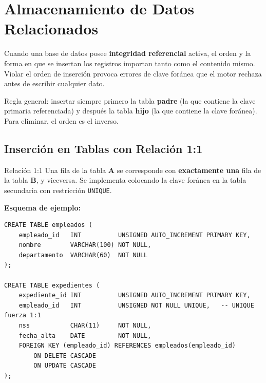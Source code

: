 \newpage
\section{Almacenamiento de Datos Relacionados}

Cuando una base de datos posee \textbf{integridad referencial} activa, el orden
y la forma en que se insertan los registros importan tanto como el contenido
mismo. Violar el orden de inserción provoca errores de clave foránea que el
motor rechaza antes de escribir cualquier dato.

\begin{nota}
  Regla general: insertar siempre primero la tabla \textbf{padre} (la que
  contiene la clave primaria referenciada) y después la tabla \textbf{hijo}
  (la que contiene la clave foránea). Para eliminar, el orden es el inverso.
\end{nota}

\subsection{Inserción en Tablas con Relación 1:1}

\begin{definicion}{Relación 1:1}
  Una fila de la tabla \textbf{A} se corresponde con \textbf{exactamente una}
  fila de la tabla \textbf{B}, y viceversa. Se implementa colocando la clave
  foránea en la tabla secundaria con restricción \texttt{UNIQUE}.
\end{definicion}

\textbf{Esquema de ejemplo:}

\begin{lstlisting}[style=sql, caption={Tablas con relación 1:1 — empleado y expediente}]
CREATE TABLE empleados (
    empleado_id   INT          UNSIGNED AUTO_INCREMENT PRIMARY KEY,
    nombre        VARCHAR(100) NOT NULL,
    departamento  VARCHAR(60)  NOT NULL
);

CREATE TABLE expedientes (
    expediente_id INT          UNSIGNED AUTO_INCREMENT PRIMARY KEY,
    empleado_id   INT          UNSIGNED NOT NULL UNIQUE,   -- UNIQUE fuerza 1:1
    nss           CHAR(11)     NOT NULL,
    fecha_alta    DATE         NOT NULL,
    FOREIGN KEY (empleado_id) REFERENCES empleados(empleado_id)
        ON DELETE CASCADE
        ON UPDATE CASCADE
);
\end{lstlisting}

